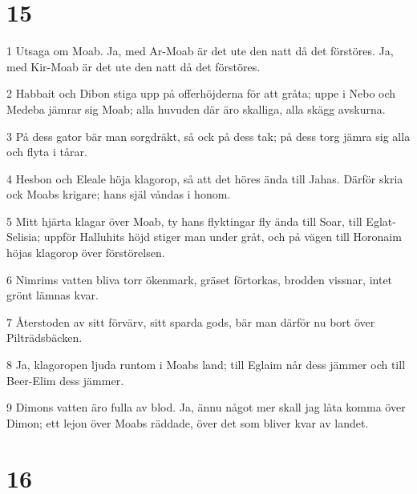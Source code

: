 \chapter{15}

\par 1 Utsaga om Moab. Ja, med Ar-Moab är det ute den natt då det förstöres. Ja, med Kir-Moab är det ute den natt då det förstöres.
\par 2 Habbait och Dibon stiga upp på offerhöjderna för att gråta; uppe i Nebo och Medeba jämrar sig Moab; alla huvuden där äro skalliga, alla skägg avskurna.
\par 3 På dess gator bär man sorgdräkt, så ock på dess tak; på dess torg jämra sig alla och flyta i tårar.
\par 4 Hesbon och Eleale höja klagorop, så att det höres ända till Jahas. Därför skria ock Moabs krigare; hans själ våndas i honom.
\par 5 Mitt hjärta klagar över Moab, ty hans flyktingar fly ända till Soar, till Eglat-Selisia; uppför Halluhits höjd stiger man under gråt, och på vägen till Horonaim höjas klagorop över förstörelsen.
\par 6 Nimrims vatten bliva torr ökenmark, gräset förtorkas, brodden vissnar, intet grönt lämnas kvar.
\par 7 Återstoden av sitt förvärv, sitt sparda gods, bär man därför nu bort över Pilträdsbäcken.
\par 8 Ja, klagoropen ljuda runtom i Moabs land; till Eglaim når dess jämmer och till Beer-Elim dess jämmer.
\par 9 Dimons vatten äro fulla av blod. Ja, ännu något mer skall jag låta komma över Dimon; ett lejon över Moabs räddade, över det som bliver kvar av landet.

\chapter{16}


